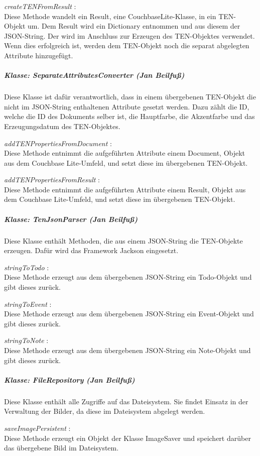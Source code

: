 \textit{ createTENFromResult }:\\
Diese Methode wandelt ein Result, eine CouchbaseLite-Klasse, in ein TEN-Objekt um. Dem Result wird ein Dictionary entnommen und aus diesem der JSON-String. Der wird im Anschluss zur Erzeugen des TEN-Objektes verwendet. Wenn dies erfolgreich ist, werden dem TEN-Objekt noch die separat abgelegten Attribute hinzugefügt.

\subparagraph{Klasse: SeparateAttributesConverter (Jan Beilfuß)}
Diese Klasse ist dafür verantwortlich, dass in einem übergebenen TEN-Objekt die nicht im JSON-String enthaltenen Attribute gesetzt werden. Dazu zählt die ID, welche die ID des Dokuments selber ist, die Hauptfarbe, die Akzentfarbe und das Erzeugungsdatum des TEN-Objektes.

\textit{ addTENPropertiesFromDocument }:\\
Diese Methode entnimmt die aufgeführten Attribute einem Document, Objekt aus dem Couchbase Lite-Umfeld, und setzt diese im übergebenen TEN-Objekt.

\textit{ addTENPropertiesFromResult }:\\
Diese Methode entnimmt die aufgeführten Attribute einem Result, Objekt aus dem Couchbase Lite-Umfeld, und setzt diese im übergebenen TEN-Objekt.

\subparagraph{Klasse: TenJsonParser (Jan Beilfuß)}
Diese Klasse enthält Methoden, die aus einem JSON-String die TEN-Objekte erzeugen. Dafür wird das Framework Jackson eingesetzt.

\textit{ stringToTodo }:\\
Diese Methode erzeugt aus dem übergebenen JSON-String ein Todo-Objekt und gibt dieses zurück.

\textit{ stringToEvent }:\\
Diese Methode erzeugt aus dem übergebenen JSON-String ein Event-Objekt und gibt dieses zurück.

\textit{ stringToNote }:\\
Diese Methode erzeugt aus dem übergebenen JSON-String ein Note-Objekt und gibt dieses zurück.

\subparagraph{Klasse: FileRepository (Jan Beilfuß)}
Diese Klasse enthält alle Zugriffe auf das Dateisystem. Sie findet Einsatz in der Verwaltung der Bilder, da diese im Dateisystem abgelegt werden.

\textit{ saveImagePersistent }:\\
Diese Methode erzeugt ein Objekt der Klasse ImageSaver und speichert darüber das übergebene Bild im Dateisystem.

